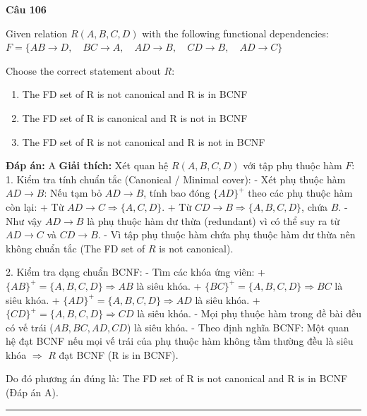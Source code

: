 \documentclass[11pt,a4paper]{article}
\newenvironment{question}[1]{%
  \par\vspace{1em}\noindent\textbf{\large Câu #1}\par\vspace{0.4em}
}{%
  \par\vspace{1em}\hrule\vspace{0.6em}
}
\newenvironment{choices}{%
  \begin{enumerate}[label=\textbf{\Alph*.},leftmargin=2.2em,itemsep=2pt,topsep=3pt]
}{%
  \end{enumerate}
}
\newcommand{\choice}{\item}
\begin{document}
\begin{question}{106}
Given relation \(R(A, B, C, D)\) with the following functional dependencies:
\(F = \{ AB \rightarrow D, \quad BC \rightarrow A, \quad AD \rightarrow B, \quad CD \rightarrow B, \quad AD \rightarrow C \}\)

Choose the correct statement about \(R\):
\begin{choices}
\choice The FD set of R is not canonical and R is in BCNF
\choice The FD set of R is canonical and R is not in BCNF
\choice The FD set of R is not canonical and R is not in BCNF
\end{choices}
\textbf{Đáp án:} A
\textbf{Giải thích:} Xét quan hệ $R(A, B, C, D)$ với tập phụ thuộc hàm $F$:
1. Kiểm tra tính chuẩn tắc (Canonical / Minimal cover):
- Xét phụ thuộc hàm $AD \rightarrow B$: Nếu tạm bỏ $AD \rightarrow B$, tính bao đóng $\{AD\}^+$ theo các phụ thuộc hàm còn lại:
  + Từ $AD \rightarrow C \Rightarrow \{A, C, D\}$.
  + Từ $CD \rightarrow B \Rightarrow \{A, B, C, D\}$, chứa $B$.
- Như vậy $AD \rightarrow B$ là phụ thuộc hàm dư thừa (redundant) vì có thể suy ra từ $AD \rightarrow C$ và $CD \rightarrow B$.
- Vì tập phụ thuộc hàm chứa phụ thuộc hàm dư thừa nên không chuẩn tắc (The FD set of $R$ is not canonical).

2. Kiểm tra dạng chuẩn BCNF:
- Tìm các khóa ứng viên:
  + $\{AB\}^+ = \{A, B, C, D\} \Rightarrow AB$ là siêu khóa.
  + $\{BC\}^+ = \{A, B, C, D\} \Rightarrow BC$ là siêu khóa.
  + $\{AD\}^+ = \{A, B, C, D\} \Rightarrow AD$ là siêu khóa.
  + $\{CD\}^+ = \{A, B, C, D\} \Rightarrow CD$ là siêu khóa.
- Mọi phụ thuộc hàm trong đề bài đều có vế trái ($AB, BC, AD, CD$) là siêu khóa.
- Theo định nghĩa BCNF: Một quan hệ đạt BCNF nếu mọi vế trái của phụ thuộc hàm không tầm thường đều là siêu khóa $\Rightarrow$ $R$ đạt BCNF (R is in BCNF).

Do đó phương án đúng là: The FD set of R is not canonical and R is in BCNF (Đáp án A).
\end{question}
\end{document}
